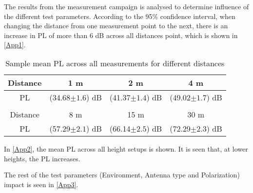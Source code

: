 
The results from the measurement campaign is analysed to determine influence of the different test parameters. According to the 95\% confidence interval, when changing the distance from one measurement point to the next, there is an increase in PL of more than 6 dB across all distances point, which is shown in \autoref{App1}.

\begin{table}[!htbp]
\centering
\caption{Sample mean PL across all measurements for different distances}
\label{App1}
\begin{tabular}{|c|c|c|c|}
\hline
Distance    & 1 m & 2 m& 4 m\\\hline
PL & (34.68$\pm 1.6$) dB & (41.37$\pm 1.4$) dB & (49.02$\pm 1.7$) dB  \\\hline
\multicolumn{4}{c}{}\\\hline
Distance	&8 m& 15 m& 30 m\\\hline
PL &	(57.29$\pm 2.1$) dB & (66.14$\pm 2.5$) dB & (72.29$\pm 2.3$) dB \\\hline
\end{tabular}
\end{table}



In \autoref{App2}, the mean PL across all height setups is shown. It is seen that, at lower heights, the PL increases.

\begin{table}[H]
\centering
\caption{Sample mean PL across all measurements for different height combinations}
\label{App2}
\end{table}


The rest of the test parameters (Environment, Antenna type and Polarization) impact is seen in \autoref{App3}. 


